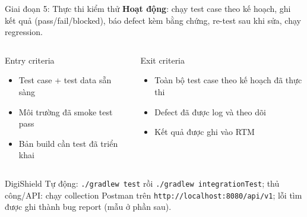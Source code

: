 \documentclass[aspectratio=169,12pt]{beamer}
\begin{document}
\begin{frame}{Giai đoạn 5: Thực thi kiểm thử}
  \textbf{Hoạt động}: chạy test case theo kế hoạch, ghi kết quả (pass/fail/blocked),
  báo defect kèm bằng chứng, re-test sau khi sửa, chạy regression.

  \vspace{0.4em}
  \begin{columns}[T]
    \begin{block}{Entry criteria}
      \begin{itemize}
        \item Test case + test data sẵn sàng
        \item Môi trường đã smoke test pass
        \item Bản build cần test đã triển khai
      \end{itemize}
    \end{block}
    \begin{block}{Exit criteria}
      \begin{itemize}
        \item Toàn bộ test case theo kế hoạch đã thực thi
        \item Defect đã được log và theo dõi
        \item Kết quả được ghi vào RTM
      \end{itemize}
    \end{block}
  \end{columns}

  \vspace{0.3em}
  \begin{exampleblock}{\small DigiShield}
    \small Tự động: \texttt{./gradlew test} rồi \texttt{./gradlew integrationTest};
    thủ công/API: chạy collection Postman trên \texttt{http://localhost:8080/api/v1};
    lỗi tìm được ghi thành bug report (mẫu ở phần sau).
  \end{exampleblock}
\end{frame}
\end{document}
